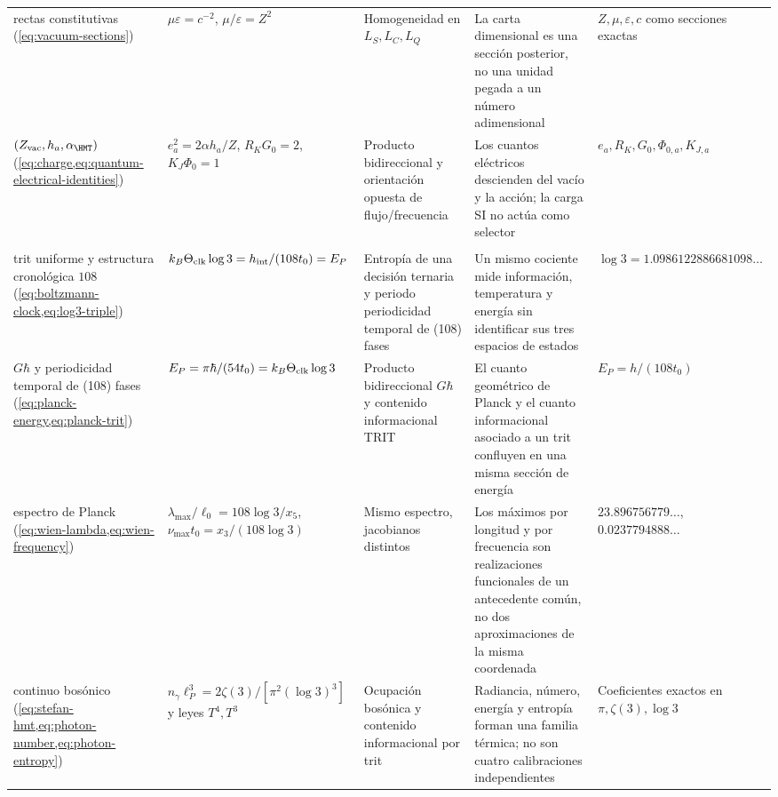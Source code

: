 \begin{longtable}{@{}
>{\raggedright\arraybackslash}p{25mm}
>{\raggedright\arraybackslash}p{37mm}
>{\raggedright\arraybackslash}p{24mm}
>{\raggedright\arraybackslash}p{29mm}
>{\raggedright\arraybackslash}p{32mm}@{}}
rectas constitutivas
(\cref{eq:vacuum-sections}) &
\(\mu\varepsilon=c^{-2}\), \(\mu/\varepsilon=Z^2\) &
Homogeneidad en \(L_S,L_C,L_Q\) &
La carta dimensional es una secci\'on posterior, no una unidad pegada a un
n\'umero adimensional &
\(Z,\mu,\varepsilon,c\) como secciones exactas\\

\((Z_{\rm vac},h_a,\alpha_{\HMT})\)
(\cref{eq:charge,eq:quantum-electrical-identities}) &
\(e_a^2=2\alpha h_a/Z\), \(R_KG_0=2\), \(K_J\Phi_0=1\) &
Producto bidireccional y orientaci\'on opuesta de flujo/frecuencia &
Los cuantos el\'ectricos descienden del vac\'io y la acci\'on; la carga SI no
act\'ua como selector &
\(e_a,R_K,G_0,\Phi_{0,a},K_{J,a}\)\\

\addlinespace
\multicolumn{5}{@{}l}{\bfseries III. Informaci\'on, temperatura y radiaci\'on}\\*
trit uniforme y estructura cronol\'ogica \(108\)
(\cref{eq:boltzmann-clock,eq:log3-triple}) &
\(k_B\Theta_{\rm clk}\log3=h_{\rm int}/(108t_0)=E_P\) &
Entrop\'ia de una decisi\'on ternaria y periodo periodicidad temporal de (108) fases &
Un mismo cociente mide informaci\'on, temperatura y energ\'ia sin identificar
sus tres espacios de estados &
\(\log3=1.0986122886681098\ldots\)\\

\(G\hbar\) y periodicidad temporal de (108) fases
(\cref{eq:planck-energy,eq:planck-trit}) &
\(E_P=\pi\hbar/(54t_0)=k_B\Theta_{\rm clk}\log3\) &
Producto bidireccional \(G\hbar\) y contenido informacional TRIT &
El cuanto geom\'etrico de Planck y el cuanto informacional asociado a un trit
confluyen en una misma secci\'on de energ\'ia &
\(E_P=h/(108t_0)\)\\

espectro de Planck
(\cref{eq:wien-lambda,eq:wien-frequency}) &
\(\lambda_{\max}/\ell_0=108\log3/x_5\),
\(\nu_{\max}t_0=x_3/(108\log3)\) &
Mismo espectro, jacobianos distintos &
Los m\'aximos por longitud y por frecuencia son realizaciones funcionales de un antecedente común, no dos
aproximaciones de la misma coordenada &
\(23.896756779\ldots\), \(0.0237794888\ldots\)\\

continuo bos\'onico
(\cref{eq:stefan-hmt,eq:photon-number,eq:photon-entropy}) &
\(n_\gamma\ell_P^3=2\zeta(3)/[\pi^2(\log3)^3]\) y leyes \(T^4,T^3\) &
Ocupaci\'on bos\'onica y contenido informacional por trit &
Radiancia, n\'umero, energ\'ia y entrop\'ia forman una familia t\'ermica; no
son cuatro calibraciones independientes &
Coeficientes exactos en \(\pi,\zeta(3),\log3\)\\


\end{longtable}
